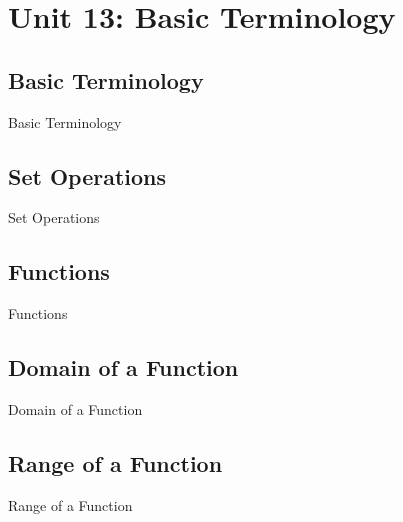 \chapter{Unit 13: Basic Terminology}
\label{chap:unit13}

\section{Basic Terminology}
\label{sec:basic-terminology}

Basic Terminology

\section{Set Operations}
\label{sec:set-operations}

Set Operations

\section{Functions}
\label{sec:functions}

Functions

\section{Domain of a Function}
\label{sec:domain-of-a-function}

Domain of a Function

\section{Range of a Function}
\label{sec:range-of-a-function}

Range of a Function


